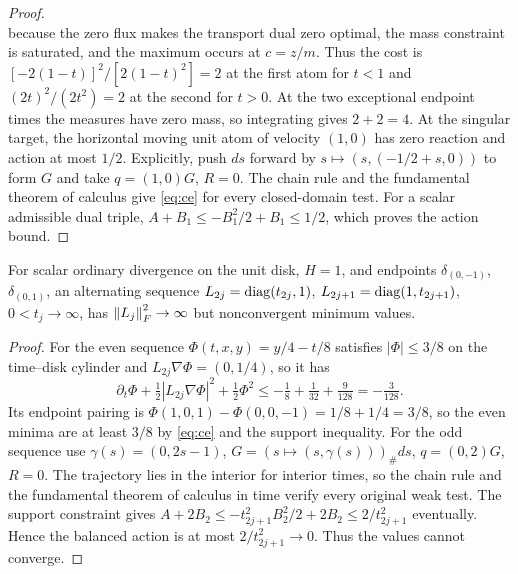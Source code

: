 \begin{proof}
\[\]
because the zero flux makes the transport dual zero optimal, the mass
constraint is saturated, and the maximum occurs at $c=z/m$.
Thus the cost is $[-2(1-t)]^2/[2(1-t)^2]=2$ at the first atom for $t<1$
and $(2t)^2/(2t^2)=2$ at the second for $t>0$. At the two exceptional endpoint
times the measures have zero mass, so integrating gives $2+2=4$.
At the singular target, the horizontal moving unit atom of velocity $(1,0)$
has zero reaction and action at most $1/2$. Explicitly, push $ds$ forward
by $s\mapsto(s,(-1/2+s,0))$ to form $G$ and take $q=(1,0)G$, $R=0$.
The chain rule and the fundamental theorem of calculus give \eqref{eq:ce} for every
closed-domain test. For a scalar admissible dual triple,
$A+B_1\le-B_1^2/2+B_1\le1/2$, which proves the action bound.
\end{proof}

\begin{proposition}\label{prop:norm}
For scalar ordinary divergence on the unit disk, $H=1$, and endpoints
$\delta_{(0,-1)}$, $\delta_{(0,1)}$, an alternating sequence
$L_{2j}=\operatorname{diag}(t_{2j},1)$, $L_{2j+1}=\operatorname{diag}(1,t_{2j+1})$, $0<t_j\to\infty$,
has $\left\lVert L_j\right\rVert_F^2\to\infty$ but nonconvergent minimum values.
\end{proposition}
\begin{proof}
For the even sequence $\Phi(t,x,y)=y/4-t/8$ satisfies
$|\Phi|\le3/8$ on the time--disk cylinder and
$L_{2j}\nabla\Phi=(0,1/4)$, so it has
\[
 \partial_t\Phi+\tfrac12|L_{2j}\nabla\Phi|^2+\tfrac12\Phi^2
 \le-\tfrac18+\tfrac1{32}+\tfrac9{128}=-\tfrac3{128}.
\]
Its endpoint pairing is
$\Phi(1,0,1)-\Phi(0,0,-1)=1/8+1/4=3/8$, so the even minima are at least
$3/8$ by \eqref{eq:ce} and the support inequality.
For the odd sequence use $\gamma(s)=(0,2s-1)$,
$G=(s\mapsto(s,\gamma(s)))_\#ds$, $q=(0,2)G$, $R=0$.
The trajectory lies in the interior for interior times, so the chain rule
and the fundamental theorem of calculus in time verify every original weak test.
The support constraint gives
$A+2B_2\le-t_{2j+1}^2B_2^2/2+2B_2\le2/t_{2j+1}^2$ eventually.
Hence the balanced action is at most $2/t_{2j+1}^2\to0$.
Thus the values cannot converge.
\end{proof}

